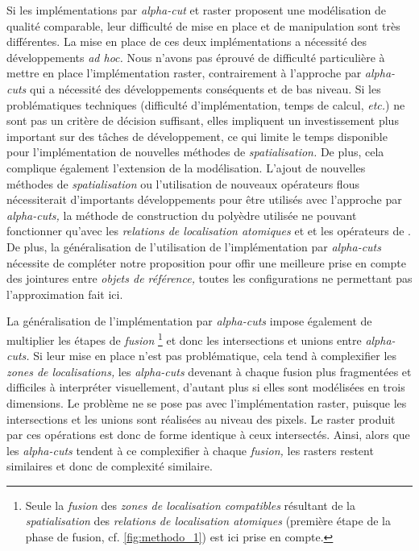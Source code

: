 Si les implémentations par \emph{alpha-cut} et raster proposent une
modélisation de qualité comparable, leur difficulté de mise en place
et de manipulation sont très différentes. La mise en place de ces deux
implémentations a nécessité des développements \emph{ad hoc.} Nous
n'avons pas éprouvé de difficulté particulière à mettre en place
l'implémentation raster, contrairement à l'approche par
\emph{alpha-cuts} qui a nécessité des développements conséquents et de
bas niveau. Si les problématiques techniques (\eg difficulté
d'implémentation, temps de calcul, \emph{etc.}) ne sont pas un critère
de décision suffisant, elles impliquent un investissement plus
important sur des tâches de développement, ce qui limite le temps
disponible pour l'implémentation de nouvelles méthodes de
\emph{spatialisation.} De plus, cela complique également l'extension
de la modélisation. L'ajout de nouvelles méthodes de
\emph{spatialisation} ou l'utilisation de nouveaux opérateurs flous
nécessiterait d'importants développements pour être utilisés avec
l'approche par \emph{alpha-cuts,} la méthode de construction du
polyèdre utilisée ne pouvant fonctionner qu'avec les \emph{relations
  de localisation atomiques}
 et
et les opérateurs de \textcite{Zadeh1965}. De plus, la généralisation
de l'utilisation de l'implémentation par \emph{alpha-cuts} nécessite
de compléter notre proposition pour offir une meilleure prise en
compte des jointures entre \emph{objets de référence,} toutes les
configurations ne permettant pas l'approximation fait ici.

La généralisation de l'implémentation par \emph{alpha-cuts} impose
également de multiplier les étapes de \emph{fusion} \footnote{Seule la
  \emph{fusion} des \emph{zones de localisation compatibles} résultant
  de la \emph{spatialisation} des \emph{relations de localisation
    atomiques} (première étape de la phase de fusion,
  cf. \autoref{fig:methodo_1}) est ici prise en compte.} et donc les
intersections et unions entre \emph{alpha-cuts.} Si leur mise en place
n'est pas problématique, cela tend à complexifier les \emph{zones de
  localisations,} les \emph{alpha-cuts} devenant à chaque fusion plus
fragmentées et difficiles à interpréter visuellement, d'autant plus si
elles sont modélisées en trois dimensions. Le problème ne se pose pas
avec l'implémentation raster, puisque les intersections et les unions
sont réalisées au niveau des pixels. Le raster produit par ces
opérations est donc de forme identique à ceux intersectés. Ainsi,
alors que les \emph{alpha-cuts} tendent à ce complexifier à chaque
\emph{fusion,} les rasters restent similaires et donc de complexité
similaire.

